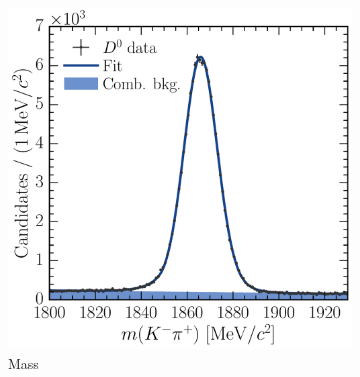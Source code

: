 \begin{table}
  \caption{%
    Prompt signal yields in the fully selected dataset, summed over all
    \pTy\ bins in which a measurement is made.
  }
  \label{tab:prod:fitting:integrated}
  \centering
  
\end{table}

\begin{figure}
  \begin{subfigure}[b]{0.5\textwidth}
    \centering
    \includegraphics[width=\textwidth]{figures/production/fitting/D0ToKpi_mass_fit_pT_3_y_2}
    \caption{Mass}
    \label{fig:prod:fitting:D0ToKpi:mass_high_sig}
  \end{subfigure}
  \begin{subfigure}[b]{0.5\textwidth}
    \centering

\end{subfigure}
\end{figure}

